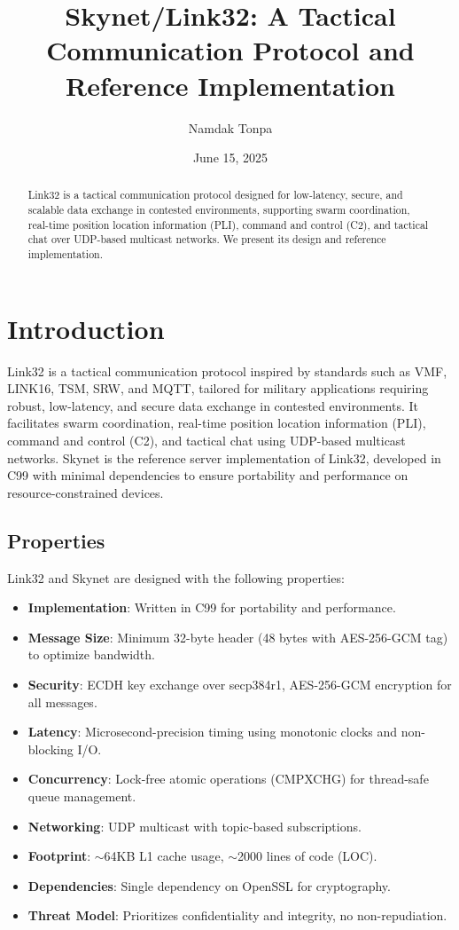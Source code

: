 \documentclass{article}
\begin{document}
\title{Skynet/Link32: A Tactical Communication Protocol and Reference Implementation}
\author{Namdak Tonpa}
\date{June 15, 2025}
\maketitle

\begin{abstract}
Link32 is a tactical communication protocol designed for low-latency, secure,
and scalable data exchange in contested environments, supporting swarm coordination,
real-time position location information (PLI), command and control (C2), and tactical
chat over UDP-based multicast networks. We present its design and reference implementation.
\end{abstract}

\tableofcontents

\section{Introduction}
Link32 is a tactical communication protocol inspired by standards such as VMF, LINK16,
TSM, SRW, and MQTT, tailored for military applications requiring robust, low-latency,
and secure data exchange in contested environments. It facilitates swarm coordination,
real-time position location information (PLI), command and control (C2), and tactical
chat using UDP-based multicast networks. Skynet is the reference server implementation
of Link32, developed in C99 with minimal dependencies to ensure portability and
 performance on resource-constrained devices.

\subsection{Properties}
Link32 and Skynet are designed with the following properties:
\begin{itemize}
    \item \textbf{Implementation}: Written in C99 for portability and performance.
    \item \textbf{Message Size}: Minimum 32-byte header (48 bytes with AES-256-GCM tag) to optimize bandwidth.
    \item \textbf{Security}: ECDH key exchange over secp384r1, AES-256-GCM encryption for all messages.
    \item \textbf{Latency}: Microsecond-precision timing using monotonic clocks and non-blocking I/O.
    \item \textbf{Concurrency}: Lock-free atomic operations (CMPXCHG) for thread-safe queue management.
    \item \textbf{Networking}: UDP multicast with topic-based subscriptions.
    \item \textbf{Footprint}: $\sim$64KB L1 cache usage, $\sim$2000 lines of code (LOC).
    \item \textbf{Dependencies}: Single dependency on OpenSSL for cryptography.
    \item \textbf{Threat Model}: Prioritizes confidentiality and integrity, no non-repudiation.
\end{itemize}
\end{document}
